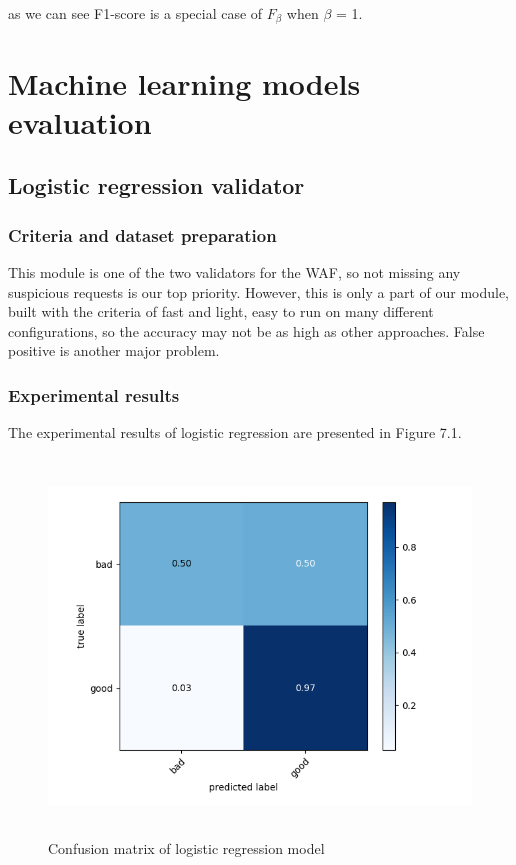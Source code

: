 as we can see F1-score is a special case of $F_\beta$ when $\beta$ = 1.

\section{Machine learning models evaluation}
\label{sec:model_evaluation}

\subsection{Logistic regression validator}
\subsubsection{Criteria and dataset preparation}
\hspace{0.5cm}This module is one of the two validators for the WAF, so not missing any suspicious requests is our top priority. However, this is only a part of our module, built with the criteria of fast and light, easy to run on many different configurations, so the accuracy may not be as high as other approaches. False positive is another major problem. 

\newpage
\subsubsection{Experimental results}
\hspace{0.5cm}The experimental results of logistic regression are presented in Figure 7.1.

\begin{figure}[ht]
	\centering
	\includegraphics[width=\linewidth, height=10cm,keepaspectratio]{figures/confusion logistic.png}
  \caption{Confusion matrix of logistic regression model}
\end{figure}

